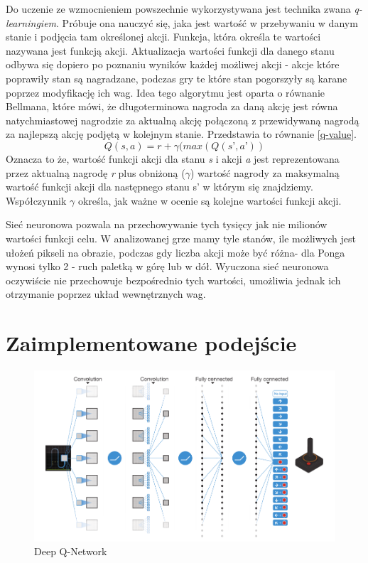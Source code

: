 \documentclass[preprint,12pt]{elsarticle}
\begin{document}
Do uczenie ze wzmocnieniem powszechnie wykorzystywana jest technika zwana \textit{q-learningiem}. Próbuje ona nauczyć się, jaka jest wartość w przebywaniu w danym stanie i podjęcia tam określonej akcji. Funkcja, która określa te wartości nazywana jest funkcją akcji. Aktualizacja wartości funkcji dla danego stanu odbywa się dopiero po poznaniu wyników każdej możliwej akcji - akcje które poprawiły stan są nagradzane, podczas gry te które stan pogorszyły są karane poprzez modyfikację ich wag. Idea tego algorytmu jest oparta o równanie Bellmana, które mówi, że długoterminowa nagroda za daną akcję jest równa natychmiastowej nagrodzie za aktualną akcję połączoną z przewidywaną nagrodą za najlepszą akcję podjętą w kolejnym stanie. Przedstawia to równanie \ref{q-value}.
\begin{equation}
\label{q-value}
Q(s,a) = r + \gamma(max(Q(s’,a’))
\end{equation}
Oznacza to że, wartość funkcji akcji dla stanu \textit{s} i akcji \textit{a} jest reprezentowana przez aktualną nagrodę \textit{r} plus obniżoną ($\gamma$) wartość nagrody za maksymalną wartość funkcji akcji  dla następnego stanu s' w którym się znajdziemy. Współczynnik $\gamma$ określa, jak ważne w ocenie są kolejne wartości funkcji akcji.

Sieć neuronowa pozwala na przechowywanie tych tysięcy jak nie milionów wartości funkcji celu. W analizowanej grze mamy tyle stanów, ile możliwych jest ułożeń pikseli na obrazie, podczas gdy liczba akcji może być różna- dla Ponga wynosi tylko 2 - ruch paletką w górę lub w dół. Wyuczona sieć neuronowa oczywiście nie przechowuje bezpośrednio tych wartości, umożliwia jednak ich otrzymanie poprzez układ wewnętrznych wag. 


\section{Zaimplementowane podejście}


\begin{figure}[h]
\centering\includegraphics[width=1\linewidth]{network.png}
\caption{Deep Q-Network}
\label{network}
\end{figure}
\end{document}
